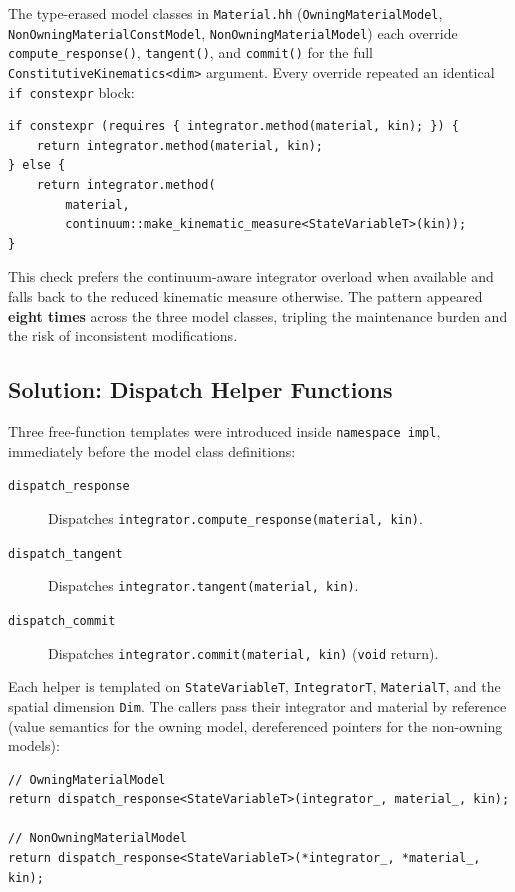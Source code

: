 The type-erased model classes in \texttt{Material.hh}
(\texttt{OwningMaterialModel}, \texttt{NonOwningMaterialConstModel},
\texttt{NonOwningMaterialModel}) each override
\texttt{compute\_response()}, \texttt{tangent()}, and
\texttt{commit()} for the full
\texttt{ConstitutiveKinematics<dim>} argument.  Every override
repeated an identical \texttt{if constexpr} block:

\begin{verbatim}
if constexpr (requires { integrator.method(material, kin); }) {
    return integrator.method(material, kin);
} else {
    return integrator.method(
        material,
        continuum::make_kinematic_measure<StateVariableT>(kin));
}
\end{verbatim}

\noindent
This check prefers the continuum-aware integrator overload when
available and falls back to the reduced kinematic measure otherwise.
The pattern appeared \textbf{eight times} across the three model
classes, tripling the maintenance burden and the risk of
inconsistent modifications.

\subsection{Solution: Dispatch Helper Functions}

Three free-function templates were introduced inside
\texttt{namespace impl}, immediately before the model class
definitions:

\begin{description}
  \item[\texttt{dispatch\_response}] Dispatches
    \texttt{integrator.compute\_response(material, kin)}.
  \item[\texttt{dispatch\_tangent}] Dispatches
    \texttt{integrator.tangent(material, kin)}.
  \item[\texttt{dispatch\_commit}] Dispatches
    \texttt{integrator.commit(material, kin)} (\texttt{void} return).
\end{description}

\noindent
Each helper is templated on \texttt{StateVariableT},
\texttt{IntegratorT}, \texttt{MaterialT}, and the spatial dimension
\texttt{Dim}.  The callers pass their integrator and material by
reference (value semantics for the owning model, dereferenced
pointers for the non-owning models):

\begin{verbatim}
// OwningMaterialModel
return dispatch_response<StateVariableT>(integrator_, material_, kin);

// NonOwningMaterialModel
return dispatch_response<StateVariableT>(*integrator_, *material_, kin);
\end{verbatim}

